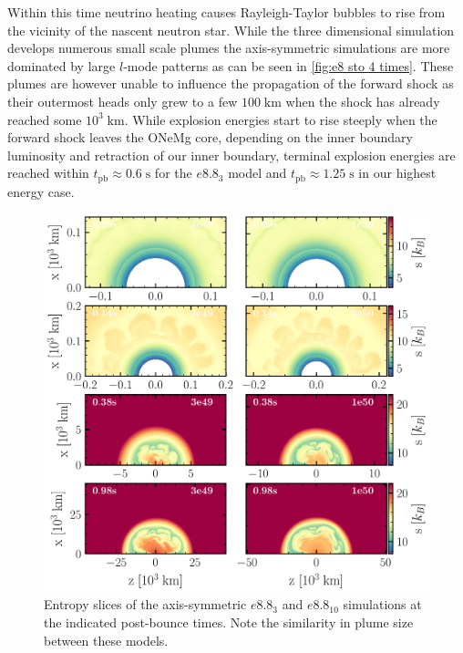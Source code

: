 \documentclass[fleqn,usenatbib]{mnras}
\begin{document}
Within this time neutrino heating causes Rayleigh-Taylor bubbles to rise from the vicinity of the nascent neutron star. While the three dimensional simulation develops numerous small scale plumes the axis-symmetric simulations are more dominated by large $l$-mode patterns as can be seen in \autoref{fig:e8 sto 4 times}. These plumes are however unable to influence the propagation of the forward shock as their outermost heads only grew to a few $100 \;\mathrm{km}$ when the shock has already reached some $10^3\;\mathrm{km}$. 
While explosion energies start to rise steeply when the forward shock leaves the ONeMg core, depending on the inner boundary luminosity and retraction of our inner boundary, terminal explosion energies are reached within $t_{\mathrm{pb}}\approx  0.6\;\mathrm{s}$ for the $e8.8_{3}$ model and  $t_{\mathrm{pb}}\approx 1.25\;\mathrm{s}$ in our highest energy case. 

\begin{figure} %
 \includegraphics[width=\textwidth]{pic/e8_sto_cuts_2d_1e50_3e49.pdf}
 \caption{Entropy slices of the axis-symmetric $e8.8_{3}$ and  $e8.8_{10}$ simulations at the indicated post-bounce times. Note the similarity in plume size between these models. }
 \label{fig:e8 2d sto times}
\end{figure}
\end{document}
